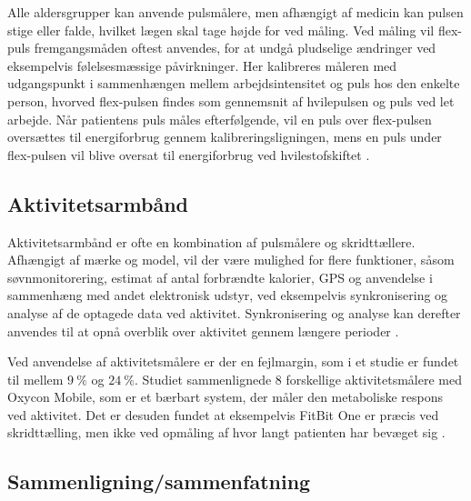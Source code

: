 Alle aldersgrupper kan anvende pulsmålere, men afhængigt af medicin kan pulsen stige eller falde, hvilket lægen skal tage højde for ved måling. Ved måling vil flex-puls fremgangsmåden oftest anvendes, for at undgå pludselige ændringer ved eksempelvis følelsesmæssige påvirkninger. Her kalibreres måleren med udgangspunkt i sammenhængen mellem arbejdsintensitet og puls hos den enkelte person, hvorved flex-pulsen findes som gennemsnit af hvilepulsen og puls ved let arbejde. Når patientens puls måles efterfølgende, vil en puls over flex-pulsen oversættes til energiforbrug gennem kalibreringsligningen, mens en puls under flex-pulsen vil blive oversat til energiforbrug ved hvilestofskiftet \citep{motionsraad2007}.


\subsection{Aktivitetsarmbånd}

Aktivitetsarmbånd er ofte en kombination af pulsmålere og skridttællere. Afhængigt af mærke og model, vil der være mulighed for flere funktioner, såsom søvnmonitorering, estimat af antal forbrændte kalorier, GPS og anvendelse i sammenhæng med andet elektronisk udstyr, ved eksempelvis synkronisering og analyse af de optagede data ved aktivitet. Synkronisering og analyse kan derefter anvendes til at opnå overblik over aktivitet gennem længere perioder \citep{pedersen2011, rudner2016, chiauzzi2014}.

Ved anvendelse af aktivitetsmålere er der en fejlmargin, som i et studie er fundet til mellem $9~\%$ og $24~\%$. Studiet sammenlignede $8$ forskellige aktivitetsmålere med Oxycon Mobile, som er et bærbart system, der måler den metaboliske respons ved aktivitet. Det er desuden fundet at eksempelvis FitBit One er præcis ved skridttælling, men ikke ved opmåling af hvor langt patienten har bevæget sig \citep{chiauzzi2014}.

\subsection{Sammenligning/sammenfatning} \label{sec:prob_sammenfatning}

